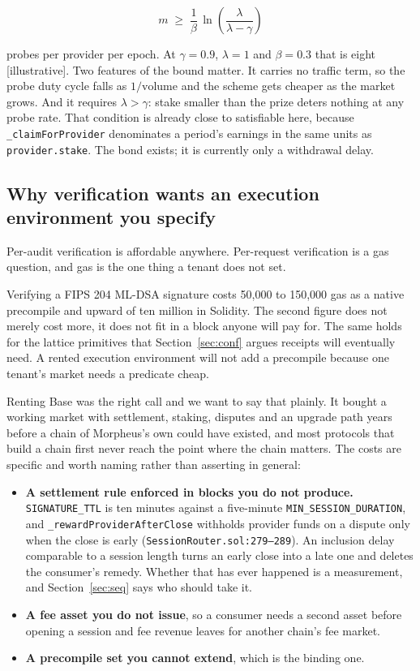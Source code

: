 \documentclass[11pt,a4paper]{article}
\newcommand{\code}[1]{\texttt{\small #1}}
\begin{document}
\[
  m \;\ge\; \frac{1}{\beta}\,
  \ln\!\left(\frac{\lambda}{\lambda - \gamma}\right)
\]

\noindent
probes per provider per epoch. At $\gamma = 0.9$, $\lambda = 1$ and
$\beta = 0.3$ that is eight [illustrative]. Two features of the bound matter. It carries no
traffic term, so the probe duty cycle falls as $1/\text{volume}$ and the scheme
gets cheaper as the market grows. And it requires $\lambda > \gamma$: stake
smaller than the prize deters nothing at any probe rate. That condition is
already close to satisfiable here, because \code{\_claimForProvider} denominates
a period's earnings in the same units as \code{provider.stake}. The bond exists;
it is currently only a withdrawal delay.

\subsection{Why verification wants an execution environment you specify}
\label{sec:l1}

Per-audit verification is affordable anywhere. Per-request verification is a gas
question, and gas is the one thing a tenant does not set.

Verifying a FIPS 204 ML-DSA signature costs 50{,}000 to 150{,}000 gas as a
native precompile and upward of ten million in Solidity. The second figure does
not merely cost more, it does not fit in a block anyone will pay for. The same
holds for the lattice primitives that Section~\ref{sec:conf} argues receipts
will eventually need. A rented execution environment will not add a precompile
because one tenant's market needs a predicate cheap.

Renting Base was the right call and we want to say that plainly. It bought a
working market with settlement, staking, disputes and an upgrade path years
before a chain of Morpheus's own could have existed, and most protocols that
build a chain first never reach the point where the chain matters. The costs are
specific and worth naming rather than asserting in general:

\begin{itemize}
\item \textbf{A settlement rule enforced in blocks you do not produce.}
\code{SIGNATURE\_TTL} is ten minutes against a five-minute
\code{MIN\_SESSION\_DURATION}, and \code{\_rewardProviderAfterClose} withholds
provider funds on a dispute only when the close is early
(\code{SessionRouter.sol:279--289}). An inclusion delay comparable to a session
length turns an early close into a late one and deletes the consumer's remedy.
Whether that has ever happened is a measurement, and Section~\ref{sec:seq} says
who should take it.
\item \textbf{A fee asset you do not issue}, so a consumer needs a second asset
before opening a session and fee revenue leaves for another chain's fee market.
\item \textbf{A precompile set you cannot extend}, which is the binding one.
\end{itemize}
\end{document}
